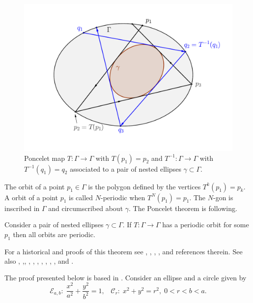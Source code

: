 \begin{figure}[H]
	\begin{center}
	 \includegraphics[scale=0.5]{chap_02/pics/pics_chap2-030-poncelet-map.pdf}
		\caption {Poncelet map  $T:\Gamma\to\Gamma$ with $T(p_1)=p_2$ and $T^{-1}:\Gamma\to\Gamma$ with $T^{-1}(q_1)=q_2$ associated to  a pair of nested ellipses $\gamma\subset\Gamma$.
		\label{fig:poncelet-map}}
	\end{center}
\end{figure}

The orbit of a point $p_1\in \Gamma$ is the polygon defined by the vertices $T^k(p_1)=p_k.$ 
A orbit of a point $p_1$ is called $N$-periodic when $T^N(p_1)=p_1.$ The $N$-gon is inscribed in $\Gamma$
and circumscribed about $\gamma.$
The Poncelet theorem is following.
\begin{theorem} Consider a pair of nested ellipses $\gamma\subset \Gamma$. If $T:\Gamma\to\Gamma$ has a periodic orbit for some $p_1$ then all orbits are periodic. 
\end{theorem}
%
For a historical and proofs of this theorem see \cite{barth1996}, \cite{centina2016a}, \cite{centina2016b}, \cite{chasles1843}, \cite{drag2014} and references therein. See also    \cite[Chapter IV]{berger2010},  \cite{cima2010},\cite{cieslak2016}, \cite[Livre III, Chapitres II, III]{darboux1917}, \cite{drag_milena2011},  \cite[Chapter 9]{gla2016}, \cite{hahu2015}, \cite{hahu2017}, \cite{leb1921},  \cite{mirman2012},  \cite{poncelet1822} and \cite{previ1999}.

The proof presented below  is based in \cite{shoe1983}. 
Consider an ellipse and a circle given by
\[\mathcal{E}_{a,b}: \;\frac{x^2}{a^2}+\frac{y^2}{b^2}=1, \;\;\; \mathcal{C}_r:\; x^2+y^2=r^2, \; 0<r<b<a.\]

